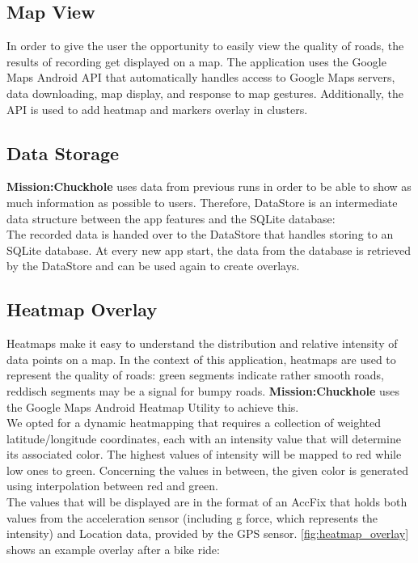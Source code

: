 \documentclass[10pt,a4paper]{article} %
\begin{document}
    
    	
    	
    
    
    



    \subsection{Map View}
    	In order to give the user the opportunity to easily view the quality of roads, the results of recording get displayed on a map. The application uses the Google Maps Android API that automatically handles access to Google Maps servers, data downloading, map display, and response to map gestures. 
    Additionally, the API is used to add heatmap and markers overlay in clusters.


    \subsection{Data Storage}
    \textbf{Mission:Chuckhole} uses data from previous runs in order to be able to show as much information as possible to users.
    	Therefore, DataStore is an intermediate data structure between the app features and the SQLite database:\\
	The recorded data is handed over to the DataStore that handles storing to an SQLite database.
	At every new app start, the data from the database is retrieved by the DataStore and can be used again to create overlays.    

    
    \subsection{Heatmap Overlay}
    

	Heatmaps make it easy to understand the distribution and relative intensity of data points on a map.
	In the context of this application, heatmaps are used to represent the quality of roads: green segments indicate rather smooth roads, reddisch segments may be a signal for bumpy roads.
	\textbf{Mission:Chuckhole} uses the Google Maps Android Heatmap Utility to achieve this.\\
    	We opted for a dynamic heatmapping that requires a collection of weighted latitude/longitude coordinates, each with an intensity value that will determine its associated color.
    	The highest values of intensity will be mapped to red while low ones to green. Concerning the values in between, the given color is generated using interpolation between red and green. \\
    	The values that will be displayed are in the format of an AccFix that holds both values from the acceleration sensor (including g force, which represents the intensity) and Location data, provided by the GPS sensor.
	\autoref{fig:heatmap_overlay} shows an example overlay after a bike ride:
     
\end{document}
